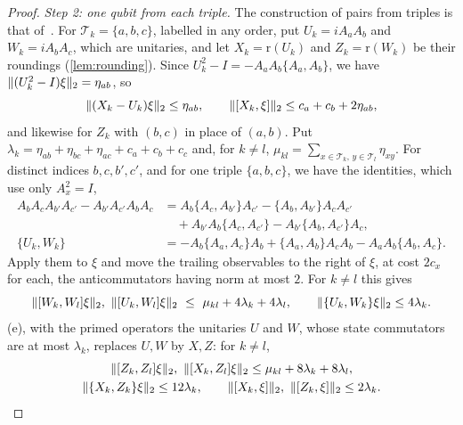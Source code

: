 \begin{proof}
\emph{Step 2: one qubit from each triple.} The construction of pairs from triples is that of~\cite{OV18}. For $\mathcal T_k=\{a,b,c\}$,
labelled in any order, put $U_k=iA_aA_b$ and $W_k=iA_bA_c$, which are unitaries, and let $X_k=\mathrm r(U_k)$ and $Z_k=\mathrm r(W_k)$ be
their roundings (\cref{lem:rounding}). Since $U_k^2-I=-A_aA_b\{A_a,A_b\}$, we have $\lVert (U_k^2-I)\xi\rVert_2=\eta_{ab}$, so
\[
\lVert (X_k-U_k)\xi\rVert_2\le\eta_{ab},\qquad\lVert [X_k,\xi]\rVert_2\le c_a+c_b+2\eta_{ab},
\]
and likewise for $Z_k$ with $(b,c)$ in place of $(a,b)$. Put $\lambda_k=\eta_{ab}+\eta_{bc}+\eta_{ac}+c_a+c_b+c_c$ and, for $k\ne l$,
$\mu_{kl}=\sum_{x\in\mathcal T_k,\,y\in\mathcal T_l}\eta_{xy}$. For distinct indices $b,c,b',c'$, and for one triple $\{a,b,c\}$, we have
the identities, which use only $A_x^2=I$,
\begin{align*}
A_bA_cA_{b'}A_{c'}-A_{b'}A_{c'}A_bA_c&=A_b\{A_c,A_{b'}\}A_{c'}-\{A_b,A_{b'}\}A_cA_{c'}\\
&\quad+A_{b'}A_b\{A_c,A_{c'}\}-A_{b'}\{A_b,A_{c'}\}A_c,\\
\{U_k,W_k\}&=-A_b\{A_a,A_c\}A_b+\{A_a,A_b\}A_cA_b-A_aA_b\{A_b,A_c\}.
\end{align*}
Apply them to $\xi$ and move the trailing observables to the right of $\xi$, at cost $2c_x$ for each, the anticommutators having norm at
most $2$. For $k\ne l$ this gives
\[
\hs{[W_k,W_l]\xi},\ \hs{[U_k,W_l]\xi}\ \le\ \mu_{kl}+4\lambda_k+4\lambda_l,\qquad\hs{\{U_k,W_k\}\xi}\le4\lambda_k .
\]
(e), with the primed operators the unitaries $U$ and $W$, whose state commutators are at most $\lambda_k$, replaces
$U,W$ by $X,Z$: for $k\ne l$,
\begin{gather*}
\hs{[Z_k,Z_l]\xi},\ \hs{[X_k,Z_l]\xi}\le\mu_{kl}+8\lambda_k+8\lambda_l,\\
\hs{\{X_k,Z_k\}\xi}\le12\lambda_k,\qquad\hs{[X_k,\xi]},\ \hs{[Z_k,\xi]}\le2\lambda_k .
\end{gather*}


\end{proof}
